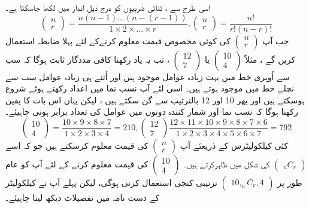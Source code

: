 اسی طرح سے ، ثنائی  ضربیوں  کو درج ذیل انداز میں لکھا جاسکتا ہے۔ 
  \[ \begin{pmatrix}
     n\\r
     \end{pmatrix}
    =\frac{n(n-1)...(n-(r-1))}{1\times2\times...\times r},
     \begin{pmatrix}
    n\\r
     \end{pmatrix}
     =\frac{n!}{r!(n-r)!}\]
جب آپ
    \(\begin{pmatrix}
     n\\r
     \end{pmatrix}\)
کی کوئی مخصوص قیمت معلوم کرنےکے لئے پہلا ضابطہ  استعمال کریں گے ، مثلاً
\(  \begin{pmatrix}
     10\\4
     \end{pmatrix}\)
 یا   
    \( \begin{pmatrix}
     12\\7
     \end{pmatrix}\)
، تب یہ یاد رکھنا کافی مددگار ثابت ہوگا کہ سب سے اُوپری خط میں بہت زیادہ عوامل موجود ہیں اور اُتنے ہی زیادہ عوامل سب سے نچلے خط میں موجود ہوتے ہیں۔  اسی لئے آپ نسب نما میں اعداد رکھتے ہوئے شروع ہوسکتے ہیں اور پھر 
10
  اور 
12
بالترتیب سے گن سکتے ہیں ، لیکن یہاں اس بات کا یقین رکھنا ہوگا کہ نسب نما اور شمار کنندہ دونوں میں عوامل کی تعداد برابر ہونی چاہیئے۔  
 \[ \begin{pmatrix}
     10\\4
     \end{pmatrix}
     =\frac{10\times9\times8\times7}{1\times2\times3\times4}=210,
     \begin{pmatrix}
     12\\7
     \end{pmatrix}
     \frac{12\times11\times10\times9\times8\times7\times6}{1\times2\times3\times4\times5\times6\times7}=792\]
کئی  کیلکولیٹرس    کے ذریعئے آپ  
    \(\begin{pmatrix}
     n\\r
     \end{pmatrix}\)
 کی قیمت  معلوم کرسکتے ہیں  جو کہ اسے 
 \(\begin{pmatrix}
 _{n}C_{r}
 \end{pmatrix}\)
کی شکل میں ظاہرکرتے ہیں۔   
\( \begin{pmatrix}
    10\\4
     \end{pmatrix}\)
  کی قیمت معلوم کرنے کے لئے آپ کو عام طور پر
\(\begin{pmatrix}
10,_{n}C_{r},4
\end{pmatrix}\)
ترتیبی کنجی استعمال کرنی ہوگی، لیکن پہلے آپ نے کیلکولیٹر کے    دست نامہ    میں تفصیلات دیکھ لینا چاہیئے۔ 

